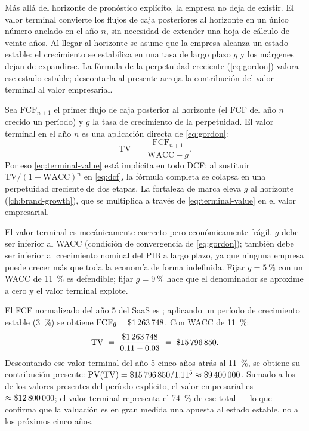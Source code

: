 Más allá del horizonte de pronóstico explícito, la empresa no deja de existir. El valor terminal convierte
los flujos de caja posteriores al horizonte en un único número anclado en el año \(n\), sin necesidad de
extender una hoja de cálculo de veinte años. Al llegar al horizonte se asume que la empresa alcanza un estado
estable: el crecimiento se estabiliza en una tasa de largo plazo \(g\) y los márgenes dejan de expandirse. La
fórmula de la perpetuidad creciente (\cref{eq:gordon}) valora ese estado estable; descontarla al presente
arroja la contribución del valor terminal al valor empresarial.

Sea \(\mathrm{FCF}_{n+1}\) el primer flujo de caja posterior al horizonte (el FCF del año \(n\) crecido un
período) y \(g\) la tasa de crecimiento de la perpetuidad. El valor terminal en el año \(n\) es una aplicación
directa de \cref{eq:gordon}:
\begin{equation}\label{eq:terminal-value}
  \mathrm{TV} \;=\; \frac{\mathrm{FCF}_{n+1}}{\mathrm{WACC}-g}.
\end{equation}
Por eso \cref{eq:terminal-value} está implícita en todo DCF: al sustituir
\(\mathrm{TV}/(1+\mathrm{WACC})^n\) en \cref{eq:dcf}, la fórmula completa se colapsa en una perpetuidad
creciente de dos etapas. La fortaleza de marca eleva \(g\) al horizonte
(\cref{ch:brand-growth}), que se multiplica a través de \cref{eq:terminal-value} en el valor empresarial.

El valor terminal es mecánicamente correcto pero económicamente frágil. \(g\) debe ser inferior al WACC
(condición de convergencia de \cref{eq:gordon}); también debe ser inferior al crecimiento nominal del PIB
a largo plazo, ya que ninguna empresa puede crecer más que toda la economía de forma indefinida. Fijar
\(g=\qty{5}{\percent}\) con un WACC de \qty{11}{\percent} es defendible; fijar
\(g=\qty{9}{\percent}\) hace que el denominador se aproxime a cero y el valor terminal explote.

\begin{example}
El FCF normalizado del año 5 del SaaS es ; aplicando un período de crecimiento
estable (\qty{3}{\percent}) se obtiene \(\mathrm{FCF}_{6}=\$\num{1263748}\).
Con WACC de \qty{11}{\percent}:
\[
  \mathrm{TV} \;=\; \frac{\$\num{1263748}}{0.11-0.03} \;=\; \$\num{15796850}.
\]
Descontando ese valor terminal del año 5 cinco años atrás al \qty{11}{\percent}, se obtiene su
contribución presente: \(\mathrm{PV}(\mathrm{TV})=\$\num{15796850}/1.11^5\approx\$\num{9400000}\).
Sumado a los  de los valores presentes del período explícito, el valor empresarial es
\(\approx\$\num{12800000}\); el valor terminal representa el \qty{74}{\percent} de ese total ---
lo que confirma que la valuación es en gran medida una apuesta al estado estable, no a los
próximos cinco años.
\end{example}

